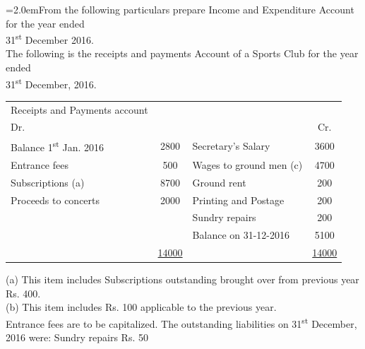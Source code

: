 \documentclass[11pt,a4paper]{article}
\newcommand{\lqn}[2]{\Needspace{6\baselineskip}\par\medskip\noindent\hangindent=2.0em\hangafter=1\makebox[2.0em][l]{\textbf{#1.}}#2\par}
\begin{document}
\lqn{21}{From the following particulars prepare Income and Expenditure Account for the year ended\\
31\textsuperscript{st} December 2016.\\
The following is the receipts and payments Account of a Sports Club for the year ended\\
31\textsuperscript{st}  December, 2016.\par
\par\smallskip\noindent\hspace*{1.2em}\begin{tabular}{|lclc|}
\hline
Receipts and Payments account &  &  &  \\
Dr. &  &  & Cr. \\
Balance 1\textsuperscript{st}  Jan. 2016 & 2800 & Secretary’s Salary & 3600 \\
Entrance fees & 500 & Wages to ground men (c) & 4700 \\
Subscriptions (a) & 8700 & Ground rent & 200 \\
Proceeds to concerts & 2000 & Printing and Postage & 200 \\
 &  & Sundry repairs & 200 \\
 &  & Balance on 31-12-2016 & 5100 \\
 & \underline{14000} &  & \underline{14000} \\
\hline
\end{tabular}\par\smallskip
(a) This item includes Subscriptions outstanding brought over from previous year Rs. 400.\\
(b) This item includes Rs. 100 applicable to the previous year.\\
Entrance fees are to be capitalized. The outstanding liabilities on 31\textsuperscript{st}  December, 2016 were: Sundry repairs Rs. 50\par
}
\end{document}
